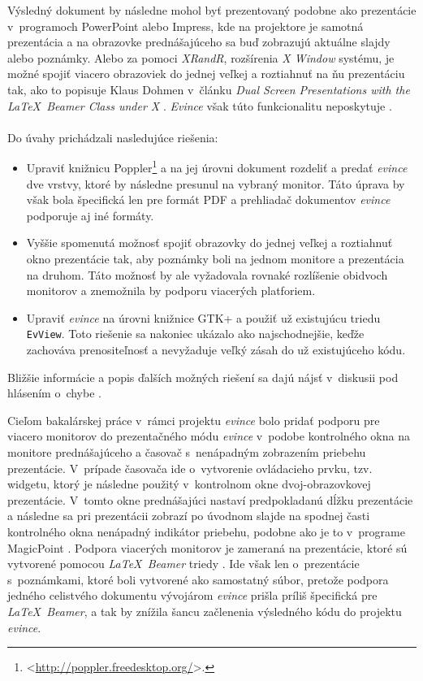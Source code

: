\documentclass[12pt,oneside,final]{fithesis2}
\begin{document}
Výsledný dokument by následne mohol byť prezentovaný podobne ako prezentácie v~programoch PowerPoint alebo Impress, kde na projektore je samotná prezentácia a na obrazovke prednášajúceho sa buď zobrazujú aktuálne slajdy alebo poznámky. Alebo za pomoci \emph{XRandR}, rozšírenia \emph{X Window} systému, je možné spojiť viacero obrazoviek do jednej veľkej a roztiahnuť na ňu prezentáciu tak, ako to popisuje Klaus Dohmen v~článku \emph{Dual Screen Presentations with the \LaTeX~Beamer Class under X} \cite{dohmen}. \emph{Evince} však túto funkcionalitu neposkytuje \cite{evbug}.
\\
\\
Do úvahy prichádzali nasledujúce riešenia:
\begin{itemize}
\item Upraviť knižnicu Poppler\footnote{<\url{http://poppler.freedesktop.org/}>.} a na jej úrovni dokument rozdeliť a predať \emph{evince} dve vrstvy, ktoré by následne presunul na vybraný monitor. Táto úprava by však bola špecifická len pre formát PDF a prehliadač dokumentov \emph{evince} podporuje aj iné formáty.
\item Vyššie spomenutá možnosť spojiť obrazovky do jednej veľkej a roztiahnuť okno prezentácie tak, aby poznámky boli na jednom monitore a prezentácia na druhom. Táto možnosť by ale vyžadovala rovnaké rozlíšenie obidvoch monitorov a znemožnila by podporu viacerých platforiem.
\item Upraviť \emph{evince} na úrovni knižnice GTK+ a použiť už existujúcu triedu \texttt{EvView}. Toto riešenie sa nakoniec ukázalo ako najschodnejšie, keďže zachováva prenositeľnosť a nevyžaduje veľký zásah do už existujúceho kódu.
\end{itemize}

Bližšie informácie a popis ďalších možných riešení sa dajú nájsť v~diskusii pod hlásením o~chybe \cite{evbug}.

Cieľom bakalárskej práce v~rámci projektu \emph{evince} bolo pridať podporu pre viacero monitorov do prezentačného módu \emph{evince} v~podobe kontrolného okna na monitore prednášajúceho a časovač s~nenápadným zobrazením priebehu prezentácie.  V~prípade časovača ide o~vytvorenie ovládacieho prvku, tzv. widgetu, ktorý je následne použitý v~kontrolnom okne dvoj-obrazovkovej prezentácie. V~tomto okne prednášajúci nastaví predpokladanú dĺžku prezentácie a následne sa pri prezentácii zobrazí po úvodnom slajde na spodnej časti kontrolného okna nenápadný indikátor priebehu, podobne ako je to v~programe MagicPoint \cite{mgp}. Podpora viacerých monitorov je zameraná na prezentácie, ktoré sú vytvorené pomocou \emph{\LaTeX~Beamer} triedy \cite{beamer}. Ide však len o~prezentácie s~poznámkami, ktoré boli vytvorené ako samostatný súbor, pretože podpora jedného celistvého dokumentu vývojárom \emph{evince} prišla príliš špecifická pre \emph{\LaTeX~Beamer}, a tak by znížila šancu začlenenia výsledného kódu do projektu \emph{evince}.
\end{document}
